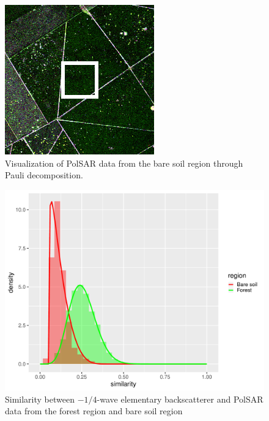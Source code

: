 \documentclass[conference]{IEEEtran}
\begin{document}
\begin{figure}[!ht]
    \vspace{.1\linewidth}
    \centering
    \includegraphics[width = .7\linewidth, height = .7\linewidth]{../../../Images/paper_19_05/bare_soil.png}
    \caption{Visualization of PolSAR data from the bare soil region through Pauli decomposition.}
    \label{fig:bare_soil}
\end{figure}

\begin{figure}[!ht]
    \centering
    \includegraphics[width = .9\linewidth, height = .7\linewidth]{../../../Figures/paper_19_05/wvn.pdf}
    \caption{Similarity between $-1/4$-wave elementary backscatterer and PolSAR data from the forest region and bare soil region }
    \label{fig:wvn}
\end{figure}
\end{document}
